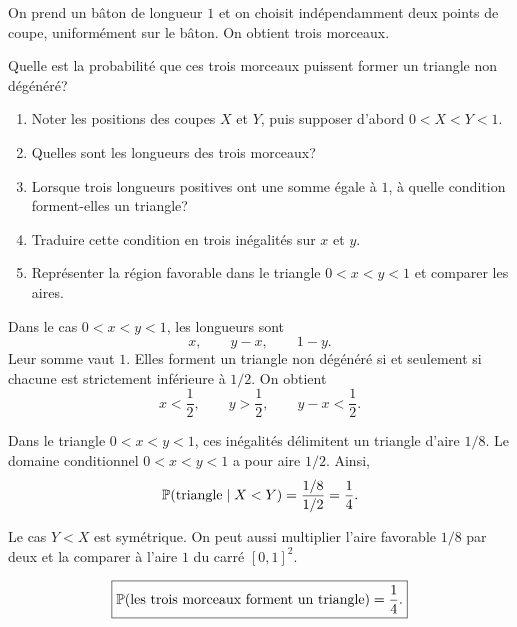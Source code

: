 \documentclass[11pt,a4paper]{article}
\begin{document}

\begin{statementbox}
On prend un bâton de longueur $1$ et on choisit indépendamment deux points de
coupe, uniformément sur le bâton. On obtient trois morceaux.

Quelle est la probabilité que ces trois morceaux puissent former un triangle
non dégénéré?
\end{statementbox}

\begin{hintsbox}
\begin{enumerate}
  \item Noter les positions des coupes $X$ et $Y$, puis supposer d'abord
  $0<X<Y<1$.
  \item Quelles sont les longueurs des trois morceaux?
  \item Lorsque trois longueurs positives ont une somme égale à $1$, à quelle
  condition forment-elles un triangle?
  \item Traduire cette condition en trois inégalités sur $x$ et $y$.
  \item Représenter la région favorable dans le triangle $0<x<y<1$ et
  comparer les aires.
\end{enumerate}
\end{hintsbox}

\correction

Dans le cas $0<x<y<1$, les longueurs sont
\[
x,\qquad y-x,\qquad1-y.
\]
Leur somme vaut $1$. Elles forment un triangle non dégénéré si et seulement si
chacune est strictement inférieure à $1/2$. On obtient
\[
x<\frac12,
\qquad y>\frac12,
\qquad y-x<\frac12.
\]

Dans le triangle $0<x<y<1$, ces inégalités délimitent un triangle d'aire
$1/8$. Le domaine conditionnel $0<x<y<1$ a pour aire $1/2$. Ainsi,
\[
\mathbb P(\text{triangle}\mid X<Y)
=\frac{1/8}{1/2}=\frac14.
\]

Le cas $Y<X$ est symétrique. On peut aussi multiplier l'aire favorable $1/8$
par deux et la comparer à l'aire $1$ du carré $[0,1]^2$.

\begin{resultbox}
\[
\boxed{\mathbb P(\text{les trois morceaux forment un triangle})=\frac14.}
\]
\end{resultbox}
\end{document}
